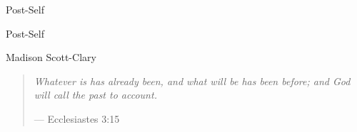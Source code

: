 \documentclass[10pt]{memoir}
\begin{document}
  \nopartblankpage
  \makeatletter
  \renewcommand*{\beforepartskip}{\null\vfill\thispagestyle{empty}}
  \renewcommand*{\afterpartskip}{\par\vskip1cm%
  \@afterindentfalse\@afterheading}
  \makeatother
  \setcounter{part}{0}

  \frontmatter

  \thispagestyle{empty}
  \null
  \vfill
  \begin{flushright}
    \DisplayFont Post-Self
  \end{flushright}
  \vfill
  \cleardoublepage

  \pagestyle{plain}


  \begin{flushright}
    \null
    \vfill
    {\Huge\DisplayFont Post-Self}

    \vfill

    {\Large\DisplayFont Madison Scott-Clary}
  \end{flushright}
  \pagestyle{empty}

  \newpage

  

  \cleartoverso
  \setcounter{tocdepth}{-1}
  \tableofcontents*
  \newpage
  \null
  \cleardoublepage

  \mainmatter

  \pagestyle{ourbook}

  \onehalfspacing

  \cleardoublepage

  \null
  \thispagestyle{empty}
  \vfill
  \begin{quote}
    \emph{Whatever is has already been, and what will be has been \mbox{before;} and God will call the past to account.}

    --- Ecclesiastes 3:15
  \end{quote}
  \vfill
  
\end{document}
